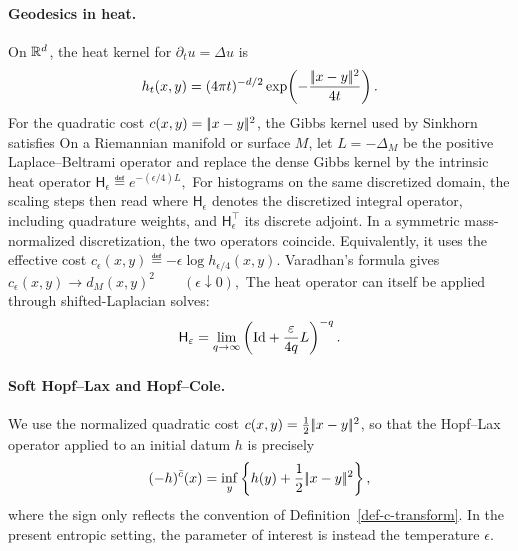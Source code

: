 \paragraph{Geodesics in heat.}
On $\mathbb{R}^d$, the heat kernel for $\partial_t u=\Delta u$ is
\[
h_t(x,y)=(4\pi t)^{-d/2}\exp\!\left(-\frac{|\!| x-y |\!|^2}{4t}\right).
\]
For the quadratic cost $c(x,y)=|\!| x-y |\!|^2$, the Gibbs kernel used by Sinkhorn satisfies
On a Riemannian manifold or surface $M$, let $L=-\Delta_M$ be the positive Laplace--Beltrami operator and replace the dense Gibbs kernel by the intrinsic heat operator
\(\mathsf H_\epsilon\eqdef e^{-(\epsilon/4)L},\)
For histograms on the same discretized domain, the scaling steps then read
where $\mathsf H_\epsilon$ denotes the discretized integral operator, including quadrature weights, and $\mathsf H_\epsilon^\top$ its discrete adjoint. In a symmetric mass-normalized discretization, the two operators coincide. Equivalently, it uses the effective cost
\(c_\epsilon(x,y)\eqdef-\epsilon\log h_{\epsilon/4}(x,y).\)
Varadhan's formula gives \(c_\epsilon(x,y)\longrightarrow d_M(x,y)^2 \qquad (\epsilon\downarrow0),\)
The heat operator can itself be applied through shifted-Laplacian solves:
\[
\mathsf H_\varepsilon
=
\lim_{q\to\infty}
\left(\mathrm{Id}+\frac{\varepsilon}{4q}L\right)^{-q}.
\]
\paragraph{Soft Hopf--Lax and Hopf--Cole.}
We use the normalized quadratic cost $c(x,y)=\frac12|\!| x-y |\!|^2$, so that the Hopf--Lax operator applied to an initial datum $h$ is precisely
\[
(-h)^{\bar c}(x)=\inf_y\left\{h(y)+\frac12|\!| x-y |\!|^2\right\},
\]
where the sign only reflects the convention of Definition~\ref{def-c-transform}. In the present entropic setting, the parameter of interest is instead the temperature $\epsilon$.

